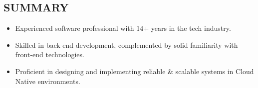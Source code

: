 \subsection*{SUMMARY}

\begin{itemize}[leftmargin=*,labelsep=1mm]
  \setlength{\parskip}{0mm}
  \setlength{\itemsep}{1mm}
  \item Experienced software professional with 14+ years in the tech industry.

  \item Skilled in back-end development, complemented by solid familiarity with front-end technologies.
  
  \item Proficient in designing and implementing reliable \& scalable systems in Cloud Native environments.
\end{itemize}
